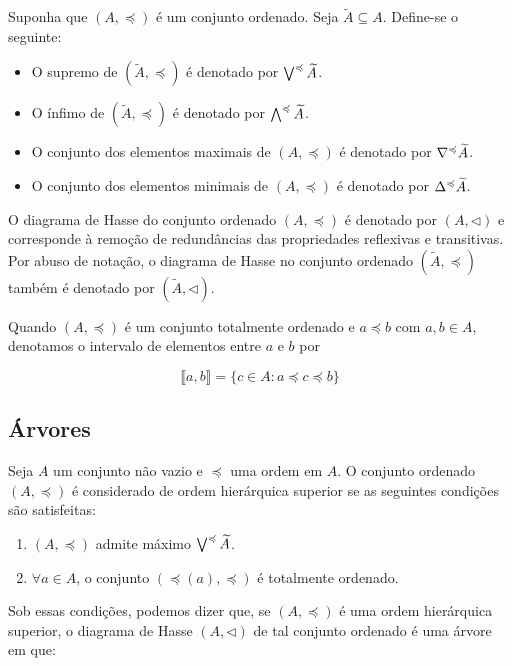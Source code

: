 Suponha que $(A, \preccurlyeq)$ é um conjunto ordenado. Seja
$\widetilde{A} \subseteq A$. Define-se o seguinte:

\begin{itemize}
    \item O supremo de $(\widetilde{A}, \preccurlyeq)$ é denotado por $\bigvee^{\preccurlyeq}\widetilde{A}$.
    \item O ínfimo de $(\widetilde{A}, \preccurlyeq)$ é denotado por $\bigwedge^{\preccurlyeq}\widetilde{A}$.
    \item O conjunto dos elementos maximais de $(A, \preccurlyeq)$ é denotado por $\nabla^{\preccurlyeq}\widetilde{A}$.
    \item O conjunto dos elementos minimais de $(A, \preccurlyeq)$ é denotado por $\Delta^{\preccurlyeq}\widetilde{A}$.

\end{itemize}

O diagrama de Hasse do conjunto ordenado $(A, \preccurlyeq)$ é denotado por
$(A, \lhd)$ e corresponde à remoção de redundâncias das propriedades reflexivas
e transitivas. Por abuso de notação, o diagrama de Hasse no conjunto ordenado
$(\widetilde{A}, \preccurlyeq)$ também é denotado por $(\widetilde{A}, \lhd)$.

Quando $(A, \preccurlyeq)$ é um conjunto totalmente ordenado e $a \preccurlyeq b$
com $a, b \in A$, denotamos o intervalo de elementos entre $a$ e $b$ por

$$\llbracket a, b \rrbracket = \{c \in A : a \preccurlyeq c \preccurlyeq b\}$$

\subsection{Árvores}
\label{sec:arvores}
Seja $A$ um conjunto não vazio e $\preccurlyeq$ uma ordem em $A$. O conjunto
ordenado $(A, \preccurlyeq)$ é considerado de ordem hierárquica superior
se as seguintes condições são satisfeitas:

\begin{enumerate}
    \item $(A, \preccurlyeq)$ admite máximo $\bigvee^{\preccurlyeq}\widetilde{A}$.
    \item $\forall a \in A$, o conjunto $(\preccurlyeq(a), \preccurlyeq)$ é totalmente ordenado.
\end{enumerate}

Sob essas condições, podemos dizer que, se $(A, \preccurlyeq)$ é uma ordem hierárquica
superior, o diagrama de Hasse $(A, \lhd)$ de tal conjunto ordenado é uma árvore em que:

